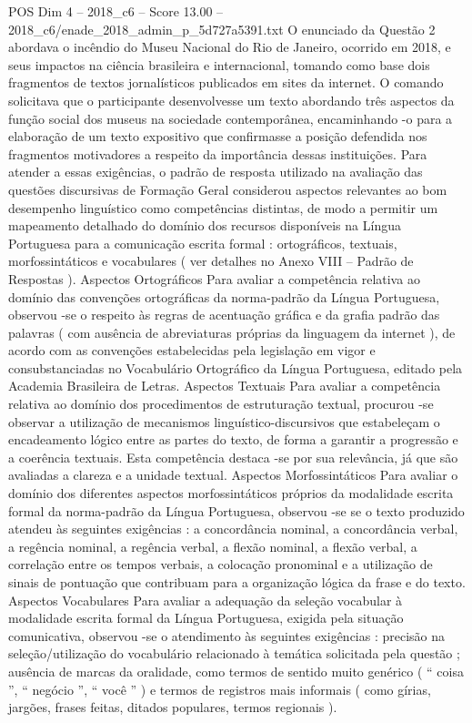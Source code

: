 \begin{textsample}{POS Dim 4 – 2018\_c6 – Score 13.00 – 2018\_c6/enade\_2018\_admin\_p\_5d727a5391.txt}
O enunciado da Questão 2 abordava o incêndio do Museu Nacional do Rio de Janeiro, ocorrido em 2018, e seus impactos na ciência brasileira e internacional, tomando como base dois fragmentos de textos jornalísticos publicados em sites da internet.
O comando solicitava que o participante desenvolvesse um texto abordando três aspectos da função social dos museus na sociedade contemporânea, encaminhando -o para a elaboração de um texto expositivo que confirmasse a posição defendida nos fragmentos motivadores a respeito da importância dessas instituições.
Para atender a essas exigências, o padrão de resposta utilizado na avaliação das questões discursivas de Formação Geral considerou aspectos relevantes ao bom desempenho linguístico como competências distintas, de modo a permitir um mapeamento detalhado do domínio dos recursos disponíveis na Língua Portuguesa para a comunicação escrita formal : ortográficos, textuais, morfossintáticos e vocabulares ( ver detalhes no Anexo VIII – Padrão de Respostas ).
Aspectos Ortográficos Para avaliar a competência relativa ao domínio das convenções ortográficas da norma-padrão da Língua Portuguesa, observou -se o respeito às regras de acentuação gráfica e da grafia padrão das palavras ( com ausência de abreviaturas próprias da linguagem da internet ), de acordo com as convenções estabelecidas pela legislação em vigor e consubstanciadas no Vocabulário Ortográfico da Língua Portuguesa, editado pela Academia Brasileira de Letras.
Aspectos Textuais Para avaliar a competência relativa ao domínio dos procedimentos de estruturação textual, procurou -se observar a utilização de mecanismos linguístico-discursivos que estabeleçam o encadeamento lógico entre as partes do texto, de forma a garantir a progressão e a coerência textuais.
Esta competência destaca -se por sua relevância, já que são avaliadas a clareza e a unidade textual.
Aspectos Morfossintáticos Para avaliar o domínio dos diferentes aspectos morfossintáticos próprios da modalidade escrita formal da norma-padrão da Língua Portuguesa, observou -se se o texto produzido atendeu às seguintes exigências : a concordância nominal, a concordância verbal, a regência nominal, a regência verbal, a flexão nominal, a flexão verbal, a correlação entre os tempos verbais, a colocação pronominal e a utilização de sinais de pontuação que contribuam para a organização lógica da frase e do texto.
Aspectos Vocabulares Para avaliar a adequação da seleção vocabular à modalidade escrita formal da Língua Portuguesa, exigida pela situação comunicativa, observou -se o atendimento às seguintes exigências : precisão na seleção/utilização do vocabulário relacionado à temática solicitada pela questão ; ausência de marcas da oralidade, como termos de sentido muito genérico ( “ coisa ”, “ negócio ”, “ você ” ) e termos de registros mais informais ( como gírias, jargões, frases feitas, ditados populares, termos regionais ).

\end{textsample}
